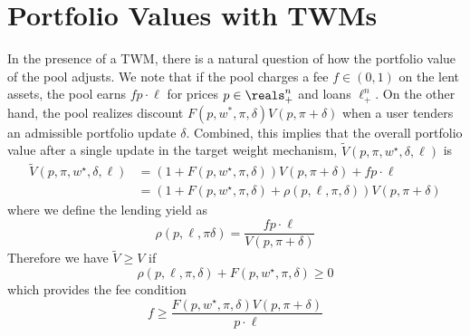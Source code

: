 \section{Portfolio Values with TWMs}\label{app:pv-fees-TWM}
In the presence of a TWM, there is a natural question of how the portfolio value of the pool adjusts.
We note that if the pool charges a fee $f \in (0, 1)$ on the lent assets, the pool earns $f p \cdot \ell$ for prices $p \in \reals^n_+$ and loans $\ell^n_+$.
On the other hand, the pool realizes discount $F(p, w^*, \pi, \delta) V(p, \pi+\delta)$ when a user tenders an admissible portfolio update $\delta$.
Combined, this implies that the overall portfolio value after a single update in the target weight mechanism, $\tilde{V}(p, \pi, w^{\star}, \delta, \ell)$ is
\begin{align}\label{eq:tvm-portfolio-value}
\tilde{V}(p, \pi, w^{\star}, \delta, \ell) &= (1+F(p, w^{\star}, \pi, \delta))V(p, \pi+\delta) + f p \cdot \ell \\
&= (1 + F(p, w^{\star}, \pi, \delta) + \rho(p, \ell, \pi, \delta)) V(p, \pi+\delta) 
\end{align}
where we define the lending yield as
\[
\rho(p, \ell, \pi \delta) = \frac{fp\cdot \ell}{V(p, \pi+\delta)}
\]
Therefore we have $\tilde{V} \geq V$ if 
\[
\rho(p, \ell, \pi, \delta) + F(p, w^{\star}, \pi, \delta) \geq 0
\]
which provides the fee condition
\[
f \geq \frac{F(p, w^{\star}, \pi, \delta) V(p, \pi + \delta)}{p\cdot \ell}
\]